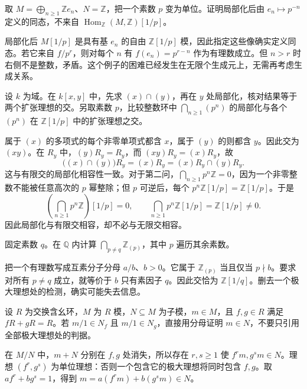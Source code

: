 \begin{exercise}\label{b3:ex:02-unbounded-hom-denominators}
	取 \(M=\bigoplus_{n\ge1}\mathbb Z e_n\)、\(N=\mathbb Z\)，把一个素数 \(p\) 变为单位。证明局部化后由 \(e_n\mapsto p^{-n}\) 定义的同态，不来自 \(\operatorname{Hom}_{\mathbb Z}(M,\mathbb Z)[1/p]\)。
\end{exercise}
\begin{solution}
	局部化后 \(M[1/p]\) 是具有基 \(e_n\) 的自由 \(\mathbb Z[1/p]\) 模，因此指定这些像确实定义同态。若它来自 \(f/p^r\)，则对每个 \(n\) 有 \(f(e_n)=p^{r-n}\) 作为有理数成立。但 \(n>r\) 时右侧不是整数，矛盾。这个例子的困难已经发生在无限个生成元上，无需再考虑生成关系。
\end{solution}

\begin{exercise}\label{b3:ex:02-intersection-calculation}
	设 \(k\) 为域。在 \(k[x,y]\) 中，先求 \((x)\cap(y)\)，再在 \(y\) 处局部化，核对结果等于两个扩张理想的交。另取素数 \(p\)，比较整数环中 \(\bigcap_{n\ge1}(p^n)\) 的局部化与各个 \((p^n)\) 在 \(\mathbb Z[1/p]\) 中的扩张理想之交。
\end{exercise}
\begin{solution}
	属于 \((x)\) 的多项式的每个非零单项式都含 \(x\)，属于 \((y)\) 的则都含 \(y\)。因此交为 \((xy)\)。在 \(R_y\) 中，\((y)R_y=R_y\)，而 \((xy)R_y=(x)R_y\)，故
	\[
		\bigl((x)\cap(y)\bigr)R_y=(x)R_y=(x)R_y\cap(y)R_y.
	\]
	这与有限交的局部化相容性一致。对于第二问，\(\bigcap_{n\ge1}p^n\mathbb Z=0\)，因为一个非零整数不能被任意高次的 \(p\) 幂整除；但 \(p\) 可逆后，每个 \(p^n\mathbb Z[1/p]=\mathbb Z[1/p]\)。于是
	\[
		\left(\bigcap_{n\ge1}p^n\mathbb Z\right)[1/p]=0, \qquad \bigcap_{n\ge1}p^n\mathbb Z[1/p]=\mathbb Z[1/p]\ne0.
	\]
	因此局部化与有限交相容，却不必与无限交相容。
\end{solution}

\begin{exercise}\label{b3:ex:02-omit-prime}
	固定素数 \(q\)。在 \(\mathbb Q\) 内计算 \(\bigcap_{p\ne q}\mathbb Z_{(p)}\)，其中 \(p\) 遍历其余素数。
\end{exercise}
\begin{solution}
	把一个有理数写成互素分子分母 \(a/b\)、\(b>0\)。它属于 \(\mathbb Z_{(p)}\) 当且仅当 \(p\nmid b\)。要求对所有 \(p\ne q\) 成立，就等价于 \(b\) 只有素因子 \(q\)。因此交恰为 \(\mathbb Z[1/q]\)。删去一个极大理想处的检测，确实可能失去信息。
\end{solution}

\begin{exercise}\label{b3:ex:02-two-open-membership}
	设 \(R\) 为交换含幺环，\(M\) 为 \(R\) 模，\(N\subseteq M\) 为子模，\(m\in M\)，且 \(f,g\in R\) 满足 \(fR+gR=R\)。若 \(m/1\in N_f\) 且 \(m/1\in N_g\)，直接用分母证明 \(m\in N\)，不要只引用全部极大理想处的判据。
\end{exercise}
\begin{solution}
	在 \(M/N\) 中，\(m+N\) 分别在 \(f,g\) 处消失，所以存在 \(r,s\ge1\) 使 \(f^rm,g^sm\in N\)。理想 \((f^r,g^s)\) 为单位理想：否则一个包含它的极大理想将同时包含 \(f,g\)。取 \(af^r+bg^s=1\)，得到 \(m=a(f^rm)+b(g^sm)\in N\)。
\end{solution}


